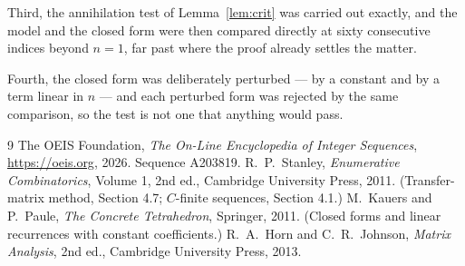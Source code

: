 \documentclass[11pt,a4paper]{article}
\theoremstyle{plain}
\theoremstyle{definition}
\begin{document}
Third, the annihilation test of Lemma~\ref{lem:crit} was carried out exactly, and the model
and the closed form were then compared directly at sixty consecutive indices beyond
$n=1$, far past where the proof already settles the matter.

Fourth, the closed form was deliberately perturbed --- by a constant and by a term linear in
$n$ --- and each perturbed form was rejected by the same comparison, so the test is not one
that anything would pass.

\begin{thebibliography}{9}
 The OEIS Foundation, \emph{The On-Line Encyclopedia of Integer
Sequences}, \url{https://oeis.org}, 2026. Sequence A203819.
 R.~P.~Stanley, \emph{Enumerative Combinatorics}, Volume 1, 2nd ed.,
Cambridge University Press, 2011. (Transfer-matrix method, Section 4.7; $C$-finite sequences,
Section 4.1.)
 M.~Kauers and P.~Paule, \emph{The Concrete Tetrahedron}, Springer, 2011.
(Closed forms and linear recurrences with constant coefficients.)
 R.~A.~Horn and C.~R.~Johnson, \emph{Matrix Analysis}, 2nd ed., Cambridge
University Press, 2013.
\end{thebibliography}
\end{document}
